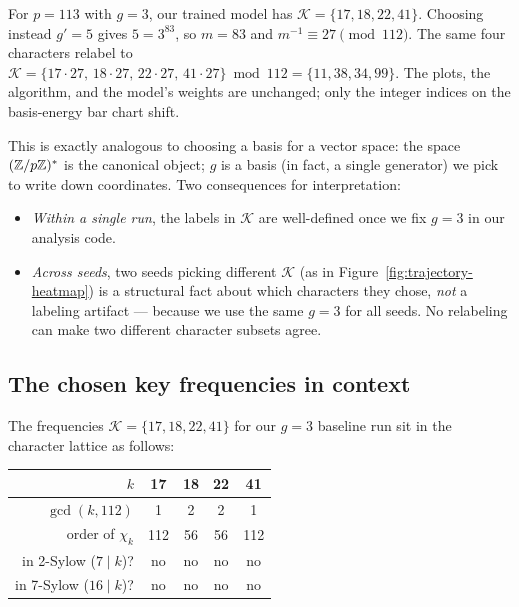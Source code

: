 \begin{example}
For $p = 113$ with $g = 3$, our trained model has
$\mathcal K = \{17, 18, 22, 41\}$.  Choosing instead $g' = 5$ gives $5 =
3^{83}$, so $m = 83$ and $m^{-1} \equiv 27 \pmod{112}$.  The same four
characters relabel to
$\mathcal K = \{17 \cdot 27,\, 18 \cdot 27,\, 22 \cdot 27,\, 41 \cdot 27\}
\bmod 112 = \{11, 38, 34, 99\}$.  The plots, the algorithm, and the model's
weights are unchanged; only the integer indices on the basis-energy bar
chart shift.
\end{example}

This is exactly analogous to choosing a basis for a vector space: the space
$(\mathbb{Z}/p\mathbb{Z})^*$ is the canonical object; $g$ is a basis (in fact, a single
generator) we pick to write down coordinates.  Two consequences for
interpretation:

\begin{itemize}[leftmargin=*]
  \item \emph{Within a single run}, the labels in $\mathcal K$ are
        well-defined once we fix $g = 3$ in our analysis code.
  \item \emph{Across seeds}, two seeds picking different $\mathcal K$ (as in
        Figure~\ref{fig:trajectory-heatmap}) is a structural fact about
        which characters they chose, \emph{not} a labeling artifact ---
        because we use the same $g = 3$ for all seeds.  No relabeling can
        make two different character subsets agree.
\end{itemize}

\subsection{The chosen key frequencies in context}
\label{subsec:K-in-context}

The frequencies $\mathcal K = \{17, 18, 22, 41\}$ for our $g=3$ baseline run
sit in the character lattice as follows:
\begin{center}
\begin{tabular}{r|cccc}
  $k$                       & 17  & 18  & 22  & 41  \\
  \hline
  $\gcd(k, 112)$            & 1   & 2   & 2   & 1   \\
  order of $\chi_k$         & 112 & 56  & 56  & 112 \\
  in 2-Sylow ($7 \mid k$)?  & no  & no  & no  & no  \\
  in 7-Sylow ($16 \mid k$)? & no  & no  & no  & no  \\
\end{tabular}
\end{center}


